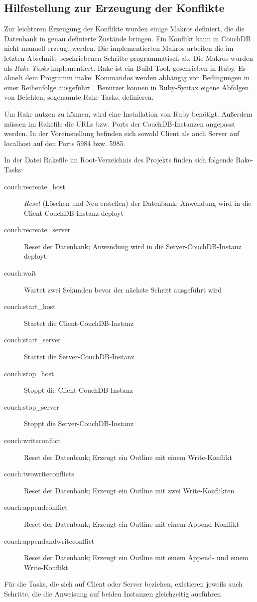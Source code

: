 \subsection{Hilfestellung zur Erzeugung der Konflikte}
\label{subsec:hilfestellung}

Zur leichteren Erzeugung der Konflikte wurden einige Makros definiert, die die Datenbank in genau definierte Zustände bringen. Ein Konflikt kann in CouchDB nicht manuell erzeugt werden. Die implementierten Makros arbeiten die im letzten Abschnitt beschriebenen Schritte programmatisch ab. Die Makros wurden als \textit{Rake-Tasks} implementiert. Rake ist ein Build-Tool, geschrieben in Ruby. Es ähnelt dem Programm make: Kommandos werden abhängig von Bedingungen in einer Reihenfolge ausgeführt \cite{rake:website}. Benutzer können in Ruby-Syntax eigene Abfolgen von Befehlen, sogenannte Rake-Tasks, definieren. 

Um Rake nutzen zu können, wird eine Installation von Ruby \cite{ruby:homepage} benötigt. Außerdem müssen im Rakefile die URLs bzw. Ports der CouchDB-Instanzen angepasst werden. In der Voreinstellung befinden sich sowohl Client als auch Server auf localhost auf den Ports 5984 bzw. 5985. 

In der Datei {\selectfont Rakefile} im Root-Verzeichnis des Projekts finden sich folgende Rake-Tasks:

\begin{description}
  \item[couch:recreate\_host] \textit{Reset} (Löschen und Neu erstellen) der Datenbank; Anwendung wird in die Client-CouchDB-Instanz deployt
  \item[couch:recreate\_server] Reset der Datenbank; Anwendung wird in die Server-CouchDB-Instanz deployt
  \item[couch:wait] Wartet zwei Sekunden bevor der nächste Schritt ausgeführt wird
  \item[couch:start\_host] Startet die Client-CouchDB-Instanz
  \item[couch:start\_server] Startet die Server-CouchDB-Instanz
  \item[couch:stop\_host] Stoppt die Client-CouchDB-Instanz
  \item[couch:stop\_server] Stoppt die Server-CouchDB-Instanz
  \item[couch:writeconflict] Reset der Datenbank; Erzeugt ein Outline mit einem Write-Konflikt
  \item[couch:twowriteconflicts] Reset der Datenbank; Erzeugt ein Outline mit zwei Write-Konflikten
  \item[couch:appendconflict] Reset der Datenbank; Erzeugt ein Outline mit einem Append-Konflikt
  \item[couch:appendandwriteconflict] Reset der Datenbank; Erzeugt ein Outline mit einem Append- und einem Write-Konflikt
\end{description}

Für die Tasks, die sich auf Client oder Server beziehen, existieren jeweils auch Schritte, die die Anweisung auf beiden Instanzen gleichzeitig ausführen.

